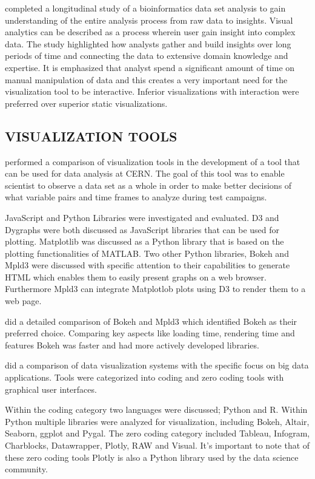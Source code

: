 \cite{saraiya2006insight} completed a longitudinal study of a bioinformatics data set analysis to gain understanding of the entire analysis process from raw data to insights. Visual analytics can be described as a process wherein user gain insight into complex data. The study highlighted how analysts gather and build insights over long periods of time and connecting the data to extensive domain knowledge and expertise. It is emphasized that analyst spend a significant amount of time on manual manipulation of data and this creates a very important need for the visualization tool to be interactive. Inferior visualizations with interaction were preferred over superior static visualizations.

\subsection{VISUALIZATION TOOLS}

\cite{barnard2015usability} performed a comparison of visualization tools in the development of a tool that can be used for data analysis at CERN. The goal of this tool was to enable scientist to observe a data set as a whole in order to make better decisions of what variable pairs and time frames to analyze during test campaigns.

JavaScript and Python Libraries were investigated and evaluated. D3 and Dygraphs were both discussed as JavaScript libraries that can be used for plotting. Matplotlib was discussed as a Python library that is based on the plotting functionalities of MATLAB. Two other Python libraries, Bokeh and Mpld3 were discussed with specific attention to their capabilities to generate HTML which enables them to easily present graphs on a web browser. Furthermore Mpld3 can integrate Matplotlob plots using D3 to render them to a web page.

\cite{barnard2015usability} did a detailed comparison of Bokeh and Mpld3 which identified Bokeh as their preferred choice. Comparing key aspects like loading time, rendering time and features Bokeh was faster and had more actively developed libraries.

\cite{fahad2018big} did a comparison of data visualization systems with the specific focus on big data applications. Tools were categorized into coding and zero coding tools with graphical user interfaces. 

Within the coding category two languages were discussed; Python and R. Within Python multiple libraries were analyzed for visualization, including Bokeh, Altair, Seaborn, ggplot and Pygal.
The zero coding category included Tableau, Infogram, Charblocks, Datawrapper, Plotly, RAW and Visual. It's important to note that of these zero coding tools Plotly is also a Python library used by the data science community.

